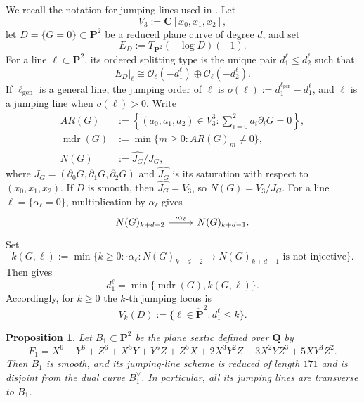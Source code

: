\documentclass[a4paper,12pt,twoside,reqno]{amsart}
\numberwithin{equation}{section}
\theoremstyle{plain}
\newtheorem{proposition}[theorem]{Proposition}
\theoremstyle{definition}
\newcommand{\PP}{\mathbf{P}}
\newcommand{\CC}{\mathbf{C}}
\newcommand{\QQ}{\mathbf{Q}}
\newcommand{\Pdual}{\check{\PP}^2}
\newcommand{\OO}{\mathscr{O}}
\theoremstyle{plain}
\theoremstyle{definition}
\begin{document}
We recall the notation for jumping lines used in \cite{DS}. Let
\[
   V_3:=\CC[x_0,x_1,x_2],
\]
let $D=\{G=0\}\subset\PP^2$ be a reduced plane curve of degree $d$, and set
\[
   E_D:=T_{\PP^2}(-\log D)(-1).
\]
For a line $\ell\subset\PP^2$, its ordered splitting type is the unique pair
$d_1^\ell\le d_2^\ell$ such that
\[
   E_D|_\ell\cong\OO_\ell(-d_1^\ell)\oplus\OO_\ell(-d_2^\ell).
\]
If $\ell_{\mathrm{gen}}$ is a general line, the jumping order of $\ell$ is
$o(\ell):=d_1^{\ell_{\mathrm{gen}}}-d_1^\ell$, and $\ell$ is a jumping line
when $o(\ell)>0$. Write
\[
\begin{aligned}
   AR(G)&:=\left\{(a_0,a_1,a_2)\in V_3^3:
      \sum_{i=0}^2a_i\partial_iG=0\right\},\\
   \operatorname{mdr}(G)&:=\min\{m\ge0:AR(G)_m\ne0\},\\
   N(G)&:=\widehat{J_G}/J_G,
\end{aligned}
\]
where $J_G=(\partial_0G,\partial_1G,\partial_2G)$ and $\widehat{J_G}$ is its
saturation with respect to $(x_0,x_1,x_2)$. If $D$ is smooth, then
$\widehat{J_G}=V_3$, so $N(G)=V_3/J_G$. For a line
$\ell=\{\alpha_\ell=0\}$, multiplication by $\alpha_\ell$ gives
\[
\begin{tikzcd}
N(G)_{k+d-2} \arrow[r, "\cdot\alpha_\ell"]
& N(G)_{k+d-1}.
\end{tikzcd}
\]
Set
\[
k(G,\ell):=\min\{k\ge0:
\cdot\alpha_\ell\colon N(G)_{k+d-2}\to N(G)_{k+d-1}
\text{ is not injective}\}.
\]
Then \cite[Proposition~4.1]{DS} gives
\[
   d_1^\ell=\min\{\operatorname{mdr}(G),k(G,\ell)\}.
\]
Accordingly, for $k\ge0$ the $k$-th jumping locus is
\[
   V_k(D):=\{\ell\in\Pdual:d_1^\ell\le k\}.
\]

\begin{proposition}\label{prop:reduced-example_h2}
Let $B_1\subset\PP^2$ be the plane sextic defined over $\QQ$ by
\[
 F_1=X^6+Y^6+Z^6+X^5Y+Y^5Z+Z^5X
     +2X^3Y^2Z+3X^2YZ^3+5XY^3Z^2.
\]
Then $B_1$ is smooth, and its jumping-line scheme is reduced of length
$171$ and is disjoint from the dual curve $B_1^\vee$. In particular, all
its jumping lines are transverse to $B_1$.
\end{proposition}
\end{document}
